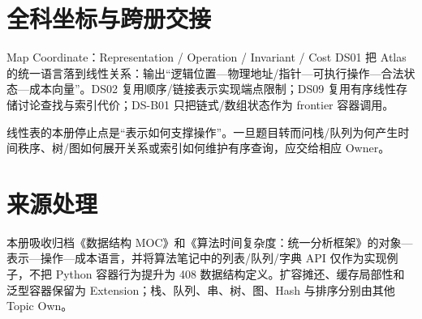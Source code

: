 \documentclass[UTF8,fontset=none,11pt,a4paper]{ctexart}
\begin{document}
\section{全科坐标与跨册交接}
\begin{corebox}{Map Coordinate：Representation / Operation / Invariant / Cost}
DS01 把 Atlas 的统一语言落到线性关系：输出“逻辑位置—物理地址/指针—可执行操作—合法状态—成本向量”。DS02 复用顺序/链接表示实现端点限制；DS09 复用有序线性存储讨论查找与索引代价；DS-B01 只把链式/数组状态作为 frontier 容器调用。
\end{corebox}
线性表的本册停止点是“表示如何支撑操作”。一旦题目转而问栈/队列为何产生时间秩序、树/图如何展开关系或索引如何维护有序查询，应交给相应 Owner。

\section{来源处理}
本册吸收归档《数据结构 MOC》和《算法时间复杂度：统一分析框架》的对象—表示—操作—成本语言，并将算法笔记中的列表/队列/字典 API 仅作为实现例子，不把 Python 容器行为提升为 408 数据结构定义。扩容摊还、缓存局部性和泛型容器保留为 Extension；栈、队列、串、树、图、Hash 与排序分别由其他 Topic Own。
\end{document}
